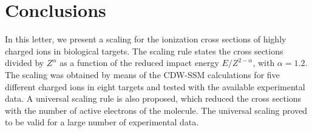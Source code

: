 \documentclass[10pt,showpacs,showkeys,twocolumn]{revtex4}
\begin{document}
\section{Conclusions}
In this letter, we present a scaling for the ionization cross sections of highly charged ions in biological targets. The scaling rule states the cross sections divided by $Z^{\alpha}$ as a function of the reduced impact energy $E/Z^{2-\alpha}$, with $\alpha=1.2$. The scaling was obtained by means of the CDW-SSM calculations for five different charged ions in eight targets and tested with the available experimental data. A universal scaling rule  is also proposed, which reduced the cross sections with the number of active electrons of the molecule. The universal scaling proved to be valid for a large number of experimental data.

\bigskip
\end{document}
